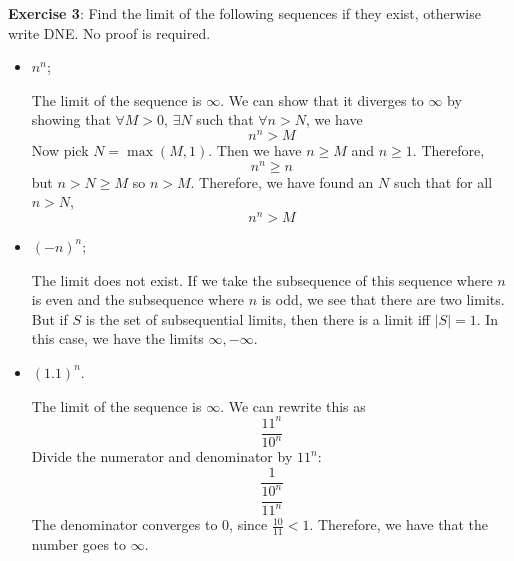 \documentclass{article}
\begin{document}
\textbf{Exercise 3}: Find the limit of the following sequences if they exist, otherwise write DNE. No proof is required.
    \begin{itemize}
        \item $n^{n}$;
            \begin{answer}
                The limit of the sequence is $\infty$. We can show that it diverges to $\infty$ by showing that $\forall M > 0$, $\exists N$ such that $\forall n> N$, we have
                    \begin{equation*}
                        n^{n} > M
                    \end{equation*}
                Now pick $N = \max(M, 1)$. Then we have $n \geq M$ and $n \geq 1$. Therefore,
                    \begin{equation*}
                        n^{n} \geq n
                    \end{equation*}
                but $n > N \geq M$ so $n > M$. Therefore, we have found an $N$ such that for all $n > N$, 
                    \begin{equation*}
                        n^{n} > M
                    \end{equation*}
            \end{answer}

        \item $(-n)^{n}$;
            \begin{answer}
                The limit does not exist. If we take the subsequence of this sequence where $n$ is even and the subsequence where $n$ is odd, we see that there are two limits. But if $S$ is the set of subsequential limits, then there is a limit iff $\lvert S \rvert = 1$. In this case, we have the limits $\infty, -\infty$.
            \end{answer}

        \item $(1.1)^{n}$.
            \begin{answer}
                The limit of the sequence is $\infty$. We can rewrite this as
                    \begin{equation*}
                        \dfrac{11^{n}}{10^{n}}
                    \end{equation*}
                Divide the numerator and denominator by $11^{n}$:
                    \begin{equation*}
                        \dfrac{1}{\dfrac{10^{n}}{11^{n}}}
                    \end{equation*}
                The denominator converges to $0$, since $\frac{10}{11} <  1$. Therefore, we have that the number goes to $\infty$.
            \end{answer}
    \end{itemize}
\end{document}
